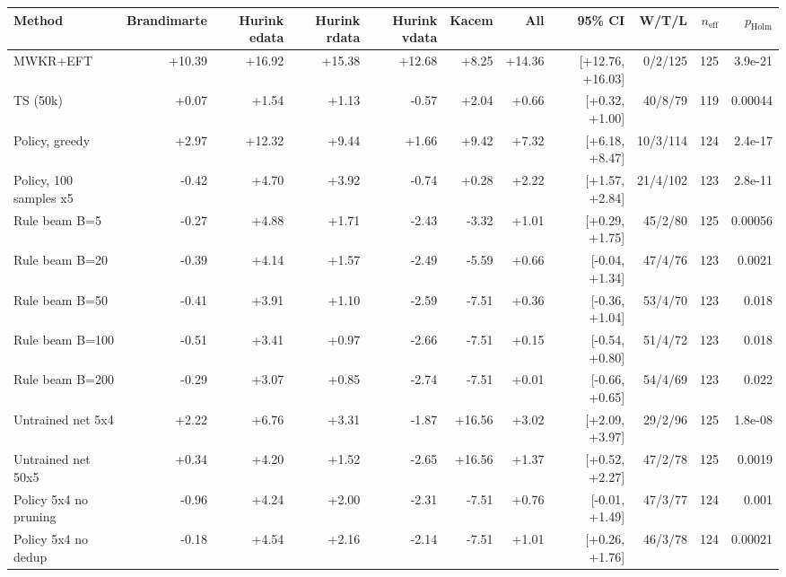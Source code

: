 \begin{tabular}{lrrrrrrrrrr}
\toprule
Method & Brandimarte & Hurink edata & Hurink rdata & Hurink vdata & Kacem & All & 95\% CI & W/T/L & $n_{\mathrm{eff}}$ & $p_{\mathrm{Holm}}$ \\
\midrule
MWKR+EFT & +10.39 & +16.92 & +15.38 & +12.68 & +8.25 & +14.36 & [+12.76, +16.03] & 0/2/125 & 125 & 3.9e-21 \\
TS (50k) & +0.07 & +1.54 & +1.13 & -0.57 & +2.04 & +0.66 & [+0.32, +1.00] & 40/8/79 & 119 & 0.00044 \\
Policy, greedy & +2.97 & +12.32 & +9.44 & +1.66 & +9.42 & +7.32 & [+6.18, +8.47] & 10/3/114 & 124 & 2.4e-17 \\
Policy, 100 samples x5 & -0.42 & +4.70 & +3.92 & -0.74 & +0.28 & +2.22 & [+1.57, +2.84] & 21/4/102 & 123 & 2.8e-11 \\
Rule beam B=5 & -0.27 & +4.88 & +1.71 & -2.43 & -3.32 & +1.01 & [+0.29, +1.75] & 45/2/80 & 125 & 0.00056 \\
Rule beam B=20 & -0.39 & +4.14 & +1.57 & -2.49 & -5.59 & +0.66 & [-0.04, +1.34] & 47/4/76 & 123 & 0.0021 \\
Rule beam B=50 & -0.41 & +3.91 & +1.10 & -2.59 & -7.51 & +0.36 & [-0.36, +1.04] & 53/4/70 & 123 & 0.018 \\
Rule beam B=100 & -0.51 & +3.41 & +0.97 & -2.66 & -7.51 & +0.15 & [-0.54, +0.80] & 51/4/72 & 123 & 0.018 \\
Rule beam B=200 & -0.29 & +3.07 & +0.85 & -2.74 & -7.51 & +0.01 & [-0.66, +0.65] & 54/4/69 & 123 & 0.022 \\
Untrained net 5x4 & +2.22 & +6.76 & +3.31 & -1.87 & +16.56 & +3.02 & [+2.09, +3.97] & 29/2/96 & 125 & 1.8e-08 \\
Untrained net 50x5 & +0.34 & +4.20 & +1.52 & -2.65 & +16.56 & +1.37 & [+0.52, +2.27] & 47/2/78 & 125 & 0.0019 \\
Policy 5x4 no pruning & -0.96 & +4.24 & +2.00 & -2.31 & -7.51 & +0.76 & [-0.01, +1.49] & 47/3/77 & 124 & 0.001 \\
Policy 5x4 no dedup & -0.18 & +4.54 & +2.16 & -2.14 & -7.51 & +1.01 & [+0.26, +1.76] & 46/3/78 & 124 & 0.00021 \\
\bottomrule
\end{tabular}
